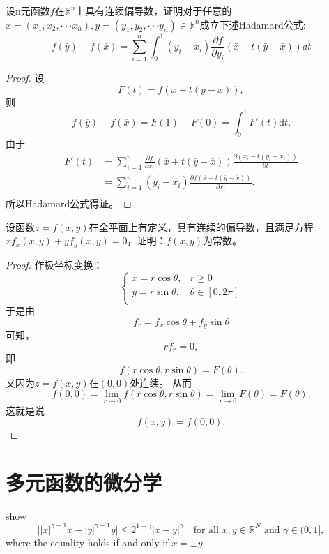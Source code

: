 	\begin{exercise}
  设n元函数$f$在$\mathbb R^n$上具有连续偏导数，证明对于任意的$x=(x_1,x_2,\cdot\cdot\cdot x_n),y=(y_1,y_2,\cdot\cdot\cdot y_n)\in \mathbb R^n$成立下述Hadamard公式:
  $$\displaystyle f(\bar{y})-f(\bar{x})=\sum_{i=1}^n\int_0^1(y_i-x_i)\frac{\partial f}{\partial y_i}(\bar{x}+t(\bar{y}-\bar{x}))dt$$
  \end{exercise}
  
  \begin{proof}
设$$F(t)=f(\overline{x}+t(\overline{y}-\overline{x})),$$
则$$f(\overline{y})-f(\overline{x})=F(1)-F(0)=\int_0^1F'(t)\mathrm{d}t.$$
由于
\begin{align*}
F'(t)&=\sum_{i=1}^n\frac{\partial f}{\partial x_i}(\overline{x}+t(\overline{y}-\overline{x}))\frac{\partial(x_i-t(y_i-x_i))}{\partial t}\\
&=\sum_{i=1}^n(y_i-x_i)\frac{\partial f(\overline{x}+t(\overline{y}-\overline{x}))}{\partial x_i}.\\
\end{align*}
所以Hadamard公式得证。
	\end{proof}

	\begin{exercise}
  设函数$z=f(x,y)$在全平面上有定义，具有连续的偏导数，且满足方程$xf_x(x,y)+yf_y(x,y)=0$，证明：$f(x,y)$为常数。
  \end{exercise}	
  
  \begin{proof}
	作极坐标变换：
	$$
	\begin{cases}
	x=r\cos\theta,&r\geq0\\
	y=r\sin\theta,&\theta\in[0,2\pi]\\
	\end{cases}	
	$$
	于是由$$f_r=f_x\cos\theta+f_y\sin\theta$$可知，$$rf_r=0,$$
	即$$f(r\cos\theta,r\sin\theta)=F(\theta).$$
	又因为$z=f(x,y)$在$(0,0)$处连续。
	从而$$f(0,0)=\lim_{r\rightarrow0}f(r\cos\theta,r\sin\theta)=\lim_{r\rightarrow0}F(\theta)=F(\theta).$$
	这就是说$$f(x,y)=f(0,0).$$
	\end{proof}
  
\section{多元函数的微分学}

\begin{exercise}
  show
    \begin{equation*}
      \Big||x|^{\gamma-1}x - |y|^{\gamma-1}y\Big|
    \leq 2^{1-\gamma}|x-y|^{\gamma}
    \quad\text{for all } x,y\in\mathbb{R}^N \text{ and } \gamma\in(0,1],
  \end{equation*}
  where the equality holds if and only if $x = \pm y$.
\end{exercise}

